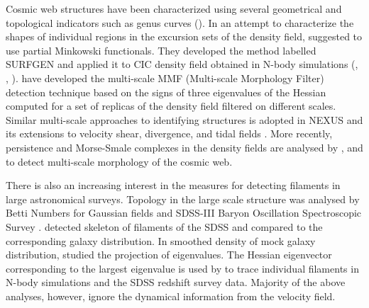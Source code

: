 \documentclass[fleqn,usenatbib,useAMS]{mnras}
\begin{document}
Cosmic web structures have been characterized using several geometrical and topological indicators such as genus curves (\cite{Gott1986}). In an attempt to characterize the shapes of  individual regions in the excursion sets of the density field, \cite{Sahni1998} suggested to use partial Minkowski functionals. They developed the method labelled SURFGEN and applied it to CIC density field obtained in N-body simulations 
(\citealt{Sathyaprakash1998}, \citealt{Sheth2003}, \citealt{Shandarin2004}). \cite{Aragon-Calvo2007} have developed the multi-scale MMF (Multi-scale Morphology Filter) detection technique based on the signs of three eigenvalues of the Hessian computed for  a set of replicas of the density field filtered on different scales. Similar multi-scale approaches to identifying structures is adopted in NEXUS and its extensions to velocity shear, divergence, and tidal fields \cite{Cautun2013}. More recently, persistence and Morse-Smale complexes in the density fields are analysed by \cite{Sousbie2011a}, \cite{Sousbie2011b} and \cite{Shivshankar2015a} to detect multi-scale morphology of the cosmic web.


There is also an increasing interest in the measures for detecting filaments in large astronomical surveys. Topology in the large scale structure was analysed by Betti Numbers for Gaussian fields \citep{Park2013} and SDSS-III Baryon Oscillation Spectroscopic Survey \citep{Parihar2014}. \cite{Sousbie2008a} detected skeleton of filaments of the SDSS and compared to the corresponding galaxy distribution. In smoothed density of mock galaxy distribution, \cite{Bond2010a} studied the projection of eigenvalues. The Hessian eigenvector corresponding to the largest eigenvalue is used by \cite{Bond2010b} to trace individual filaments in N-body simulations and the SDSS redshift survey data. Majority of the above analyses, however, ignore the dynamical information from the velocity field.



\end{document}
